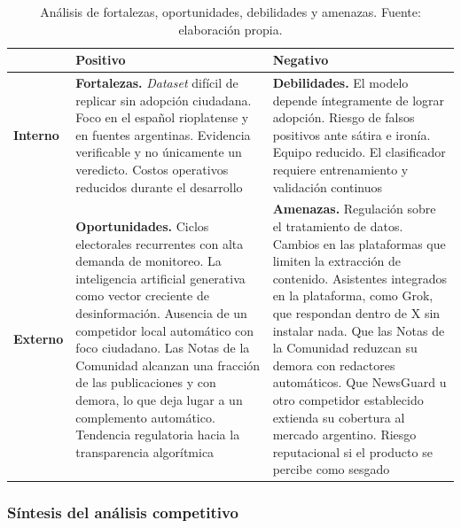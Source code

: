 \begin{table}[t]
  \centering
  \small
  \caption{Análisis de fortalezas, oportunidades, debilidades y amenazas. Fuente: elaboración propia.}
  \label{tab:foda}
  \begin{tabular}{p{1.6cm} p{5.6cm} p{5.6cm}}
    \hline
    & \textbf{Positivo} & \textbf{Negativo} \\
    \hline
    \textbf{Interno} &
    \textbf{Fortalezas.} \textit{Dataset} difícil de replicar sin adopción ciudadana. Foco en el español rioplatense y en fuentes argentinas. Evidencia verificable y no únicamente un veredicto. Costos operativos reducidos durante el desarrollo &
    \textbf{Debilidades.} El modelo depende íntegramente de lograr adopción. Riesgo de falsos positivos ante sátira e ironía. Equipo reducido. El clasificador requiere entrenamiento y validación continuos \\
    \textbf{Externo} &
    \textbf{Oportunidades.} Ciclos electorales recurrentes con alta demanda de monitoreo. La inteligencia artificial generativa como vector creciente de desinformación. Ausencia de un competidor local automático con foco ciudadano. Las Notas de la Comunidad alcanzan una fracción de las publicaciones y con demora, lo que deja lugar a un complemento automático. Tendencia regulatoria hacia la transparencia algorítmica &
    \textbf{Amenazas.} Regulación sobre el tratamiento de datos. Cambios en las plataformas que limiten la extracción de contenido. Asistentes integrados en la plataforma, como Grok, que respondan dentro de X sin instalar nada. Que las Notas de la Comunidad reduzcan su demora con redactores automáticos. Que NewsGuard u otro competidor establecido extienda su cobertura al mercado argentino. Riesgo reputacional si el producto se percibe como sesgado \\
    \hline
  \end{tabular}
\end{table}

\subsubsection{Síntesis del análisis competitivo}
\label{sec:sintesis-competencia}


